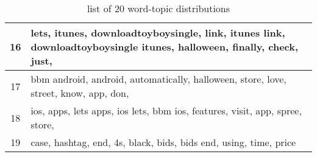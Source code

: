 \begin{table}
\begin{tabular}{c p{16cm}}
    16    & lets, itunes, downloadtoyboysingle, link, itunes link, downloadtoyboysingle itunes, halloween, finally, check, just, \\ \midrule
    17    & bbm android, android, automatically, halloween, store, love, street, know, app, don, \\ \midrule
    18    & ios, apps, lets apps, ios lets, bbm ios, features, visit, app, spree, store, \\ \midrule
    19    & case, hashtag, end, 4s, black, bids, bids end, using, time, price \\ \midrule
  \end{tabular}
  \caption{list of 20 word-topic distributions}
  \label{tab:20_topics}
\end{table}

